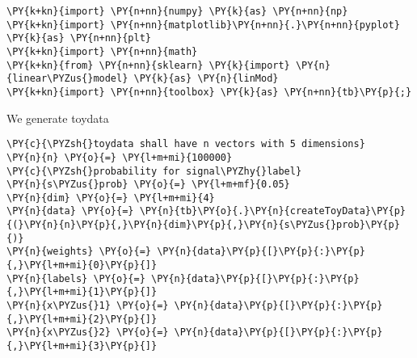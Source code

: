 
{\par%
\vspace{-1\baselineskip}%
}%
\begin{notebookcell}[]%
\begin{addmargin}[\cellleftmargin]{0em}%
{\smaller%
\par%
%
\vspace{-1\smallerfontscale}%
\begin{Verbatim}[commandchars=\\\{\}]
\PY{k+kn}{import} \PY{n+nn}{numpy} \PY{k}{as} \PY{n+nn}{np}
\PY{k+kn}{import} \PY{n+nn}{matplotlib}\PY{n+nn}{.}\PY{n+nn}{pyplot} \PY{k}{as} \PY{n+nn}{plt}
\PY{k+kn}{import} \PY{n+nn}{math}
\PY{k+kn}{from} \PY{n+nn}{sklearn} \PY{k}{import} \PY{n}{linear\PYZus{}model} \PY{k}{as} \PY{n}{linMod}
\PY{k+kn}{import} \PY{n+nn}{toolbox} \PY{k}{as} \PY{n+nn}{tb}\PY{p}{;}
\end{Verbatim}
%
\par%
\vspace{-1\smallerfontscale}}%
\end{addmargin}
\end{notebookcell}


    We generate toydata


{\par%
\vspace{-1\baselineskip}%
}%
\begin{notebookcell}[]%
\begin{addmargin}[\cellleftmargin]{0em}%
{\smaller%
\par%
%
\vspace{-1\smallerfontscale}%
\begin{Verbatim}[commandchars=\\\{\}]
\PY{c}{\PYZsh{}toydata shall have n vectors with 5 dimensions}
\PY{n}{n} \PY{o}{=} \PY{l+m+mi}{100000}
\PY{c}{\PYZsh{}probability for signal\PYZhy{}label}
\PY{n}{s\PYZus{}prob} \PY{o}{=} \PY{l+m+mf}{0.05}
\PY{n}{dim} \PY{o}{=} \PY{l+m+mi}{4}
\PY{n}{data} \PY{o}{=} \PY{n}{tb}\PY{o}{.}\PY{n}{createToyData}\PY{p}{(}\PY{n}{n}\PY{p}{,}\PY{n}{dim}\PY{p}{,}\PY{n}{s\PYZus{}prob}\PY{p}{)}
\PY{n}{weights} \PY{o}{=} \PY{n}{data}\PY{p}{[}\PY{p}{:}\PY{p}{,}\PY{l+m+mi}{0}\PY{p}{]}
\PY{n}{labels} \PY{o}{=} \PY{n}{data}\PY{p}{[}\PY{p}{:}\PY{p}{,}\PY{l+m+mi}{1}\PY{p}{]}
\PY{n}{x\PYZus{}1} \PY{o}{=} \PY{n}{data}\PY{p}{[}\PY{p}{:}\PY{p}{,}\PY{l+m+mi}{2}\PY{p}{]}
\PY{n}{x\PYZus{}2} \PY{o}{=} \PY{n}{data}\PY{p}{[}\PY{p}{:}\PY{p}{,}\PY{l+m+mi}{3}\PY{p}{]}
\end{Verbatim}
%
\par%
\vspace{-1\smallerfontscale}}%
\end{addmargin}
\end{notebookcell}


